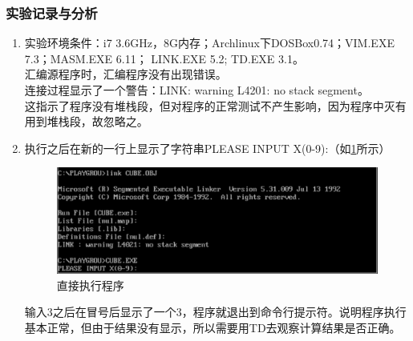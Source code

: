 \documentclass{article}
\begin{document}
	\subsubsection{实验记录与分析}
	\begin{enumerate}
		\item 实验环境条件：i7 3.6GHz，8G内存；Archlinux下DOSBox0.74；VIM.EXE 7.3；MASM.EXE  6.11； LINK.EXE 5.2; TD.EXE 3.1。\\
			汇编源程序时，汇编程序没有出现错误。\\
			连接过程显示了一个警告：LINK: warning L4201: no stack segment。\\
			这指示了程序没有堆栈段，但对程序的正常测试不产生影响，因为程序中灭有用到堆栈段，故忽略之。

		\item 执行之后在新的一行上显示了字符串PLEASE INPUT X(0-9):（如\ref{fig:rundirect}所示）
			\begin{figure}[H]
				\centering
				\includegraphics[width=0.8\linewidth]{res/homework_1/fig6.png}
				\caption{直接执行程序}
				\label{fig:rundirect}
			\end{figure}
			输入3之后在冒号后显示了一个3，程序就退出到命令行提示符。说明程序执行基本正常，但由于结果没有显示，所以需要用TD去观察计算结果是否正确。


\end{enumerate}
\end{document}

